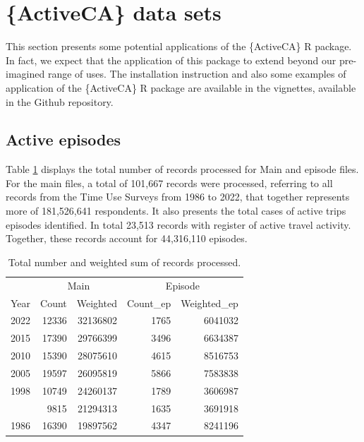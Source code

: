 \documentclass[Royal,times,sageh]{sagej}
\begin{document}
\section{\{ActiveCA\} data sets}\label{activeca-data-sets}

This section presents some potential applications of the \{ActiveCA\} R
package. In fact, we expect that the application of this package to
extend beyond our pre-imagined range of uses. The installation
instruction and also some examples of application of the \{ActiveCA\} R
package are available in the vignettes, available in the Github
repository.

\subsection{Active episodes}\label{active-episodes}

Table \ref{tab:processed-obs} displays the total number of records
processed for Main and episode files. For the main files, a total of
101,667 records were processed, referring to all records from the Time
Use Surveys from 1986 to 2022, that together represents more of
181,526,641 respondents. It also presents the total cases of active
trips episodes identified. In total 23,513 records with register of
active travel activity. Together, these records account for 44,316,110
episodes.

\begin{table}
\centering
\caption{\label{tab:table_df_processed}\label{tab:processed-obs}Total number and weighted sum of records processed.}
\centering
\fontsize{8}{10}\selectfont
\begin{tabular}[t]{rr>{}r|rr}
\toprule
\multicolumn{1}{c}{ } & \multicolumn{2}{c}{Main} & \multicolumn{2}{c}{Episode} \\
\cmidrule(l{3pt}r{3pt}){2-3} \cmidrule(l{3pt}r{3pt}){4-5}
Year & Count & Weighted & Count\_ep & Weighted\_ep\\
\midrule
2022 & 12336 & 32136802 & 1765 & 6041032\\
2015 & 17390 & 29766399 & 3496 & 6634387\\
2010 & 15390 & 28075610 & 4615 & 8516753\\
2005 & 19597 & 26095819 & 5866 & 7583838\\
1998 & 10749 & 24260137 & 1789 & 3606987\\
\addlinespace
1992 & 9815 & 21294313 & 1635 & 3691918\\
1986 & 16390 & 19897562 & 4347 & 8241196\\
\bottomrule
\end{tabular}
\end{table}
\end{document}
